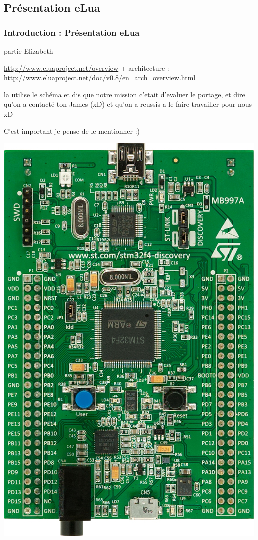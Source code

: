 \documentclass{beamer}
\begin{document}
\subsection{Présentation eLua}
\begin{frame}
\frametitle{Introduction : Présentation eLua}
partie Elizabeth

\url{http://www.eluaproject.net/overview} +
architecture : \url{http://www.eluaproject.net/doc/v0.8/en_arch_overview.html}


la utilise le schéma et dis que notre mission c'etait d'evaluer le portage, et dire
qu'on a contacté ton James (xD) et qu'on a reussis a le faire travailler pour nous xD

C'est important je pense de le mentionner :)
\begin{center}
 \includegraphics[scale=0.1]{../images/stm32f4_discovery.jpg}
\end{center}
\end{frame}
\end{document}
